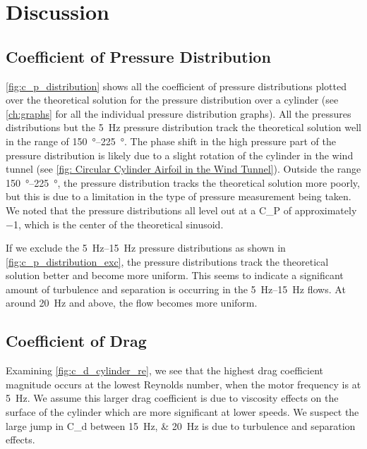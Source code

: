\chapter{Discussion}
\label{cp:discussion}

\section{Coefficient of Pressure Distribution}

\autoref{fig:c_p_distribution} shows all the coefficient of pressure distributions plotted over the theoretical solution for the pressure distribution over a cylinder (see \autoref{ch:graphs} for all the individual pressure distribution graphs). All the pressures distributions but the \qty{5}{\hertz} pressure distribution track the theoretical solution well in the range of \qtyrange{150}{225}{\degree}. The phase shift in the high pressure part of the pressure distribution is likely due to a slight rotation of the cylinder in the wind tunnel (see \autoref{fig: Circular Cylinder Airfoil in the Wind Tunnel}). Outside the range \qtyrange{150}{225}{\degree}, the pressure distribution tracks the theoretical solution more poorly, but this is due to a limitation in the type of pressure measurement being taken. We noted that the pressure distributions all level out at a \gls{C_P} of approximately \num{-1}, which is the center of the theoretical sinusoid.

If we exclude the \qtyrange{5}{15}{\hertz} pressure distributions as shown in \autoref{fig:c_p_distribution_exc}, the pressure distributions track the theoretical solution better and become more uniform. This seems to indicate a significant amount of turbulence and separation is occurring in the \qtyrange{5}{15}{\hertz} flows. At around \qty{20}{\hertz} and above, the flow becomes more uniform.

\section{Coefficient of Drag}

Examining \autoref{fig:c_d_cylinder_re}, we see that the highest drag coefficient magnitude occurs at the lowest Reynolds number, when the motor frequency is at \qty{5}{\hertz}. We assume this larger drag coefficient is due to viscosity effects on the surface of the cylinder which are more significant at lower speeds. We suspect the large jump in \gls{C_d} between \qtylist{15;20}{\hertz} is due to turbulence and separation effects.